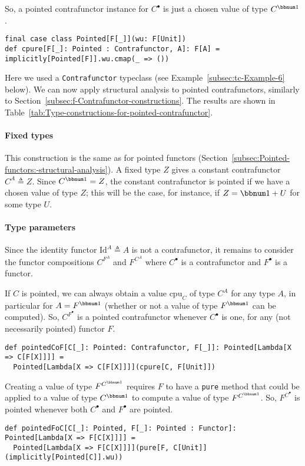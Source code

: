 So, a pointed contrafunctor instance for $C^{\bullet}$ is just a
chosen value of type $C^{\bbnum 1}$.
\begin{lstlisting}
final case class Pointed[F[_]](wu: F[Unit])
def cpure[F[_]: Pointed : Contrafunctor, A]: F[A] = implicitly[Pointed[F]].wu.cmap(_ => ())
\end{lstlisting}
Here we used a \lstinline!Contrafunctor! typeclass (see Example~\ref{subsec:tc-Example-6}
below). We can now apply structural analysis to pointed contrafunctors,
similarly to Section~\ref{subsec:f-Contrafunctor-constructions}.
The results are shown in Table~\ref{tab:Type-constructions-for-pointed-contrafunctor}.

\paragraph{Fixed types}

This construction is the same as for pointed functors (Section~\ref{subsec:Pointed-functors:-structural-analysis}).
A fixed type $Z$ gives a constant contrafunctor $C^{A}\triangleq Z$.
Since $C^{\bbnum 1}=Z$, the constant contrafunctor is pointed if
we have a chosen value of type $Z$; this will be the case, for instance,
if $Z=\bbnum 1+U$ for some type $U$. 

\paragraph{Type parameters}

Since the identity functor $\text{Id}^{A}\triangleq A$ is not a contrafunctor,
it remains to consider the functor compositions $C^{F^{A}}$ and $F^{C^{A}}$
where $C^{\bullet}$ is a contrafunctor and $F^{\bullet}$ is a functor. 

If $C$ is pointed, we can always obtain a value $\text{cpu}_{C}$
of type $C^{A}$ for any type $A$, in particular for $A=F^{\bbnum 1}$
(whether or not a value of type $F^{\bbnum 1}$ can be computed).
So, $C^{F^{\bullet}}$ is a pointed contrafunctor whenever $C^{\bullet}$
is one, for any (not necessarily pointed) functor $F$.
\begin{lstlisting}
def pointedCoF[C[_]: Pointed: Contrafunctor, F[_]]: Pointed[Lambda[X => C[F[X]]]] =
  Pointed[Lambda[X => C[F[X]]]](cpure[C, F[Unit]])
\end{lstlisting}

Creating a value of type $F^{C^{\bbnum 1}}$ requires $F$ to have
a \lstinline!pure! method that could be applied to a value of type
$C^{\bbnum 1}$ to compute a value of type $F^{C^{\bbnum 1}}$. So,
$F^{C^{\bullet}}$ is pointed whenever both $C^{\bullet}$ and $F^{\bullet}$
are pointed.
\begin{lstlisting}
def pointedFoC[C[_]: Pointed, F[_]: Pointed : Functor]: Pointed[Lambda[X => F[C[X]]]] =
  Pointed[Lambda[X => F[C[X]]]](pure[F, C[Unit]](implicitly[Pointed[C]].wu))
\end{lstlisting}


